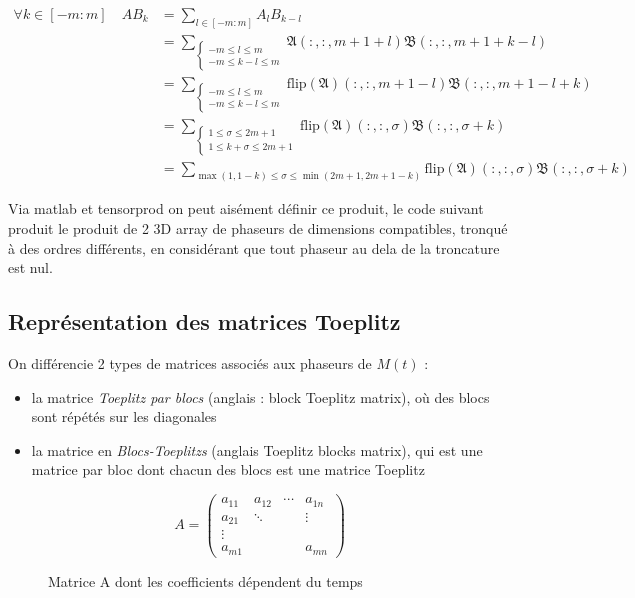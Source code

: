 \documentclass[journal,onecolumn]{IEEEtran}
\begin{document}
\begin{align}
\forall k \in [-m : m]\quad AB_{k} &= \sum_{l\in [-m: m]} A_{l} B_{k-l} \\
									&= \sum_{{\begin{cases}-m \leq l \leq m \\ -m \leq k-l \leq m\end{cases}}} \mathfrak{A}(:,:,m+1+l) \mathfrak{B}(:,:,m+1+k-l)\\
									&= \sum_{{\begin{cases}-m \leq l \leq m \\ -m \leq k-l \leq m\end{cases}}} \mathrm{flip}\left(\mathfrak{A}\right)(:,:,m+1-l) \mathfrak{B}(:,:,m+1-l+k)\\
									&= \sum_{{\begin{cases}1 \leq \sigma \leq 2m+1 \\ 1 \leq k+\sigma \leq 2m+1\end{cases}}} \mathrm{flip}\left(\mathfrak{A}\right)(:,:,\sigma) \mathfrak{B}(:,:,\sigma+k)\\
									&= \sum_{{\max (1,1-k) \leq \sigma \leq \min (2m+1,2m+1-k) }} \mathrm{flip}\left(\mathfrak{A}\right)(:,:,\sigma) \mathfrak{B}(:,:,\sigma+k)
\end{align}

Via matlab et tensorprod on peut aisément définir ce produit, le code suivant produit le produit de 2 3D array de phaseurs de dimensions compatibles, tronqué à des ordres différents, en considérant que tout phaseur au dela de la troncature est nul. 




\subsection{Représentation des matrices Toeplitz}

On différencie 2 types de matrices associés aux phaseurs de $M(t)$ : 
\begin{itemize}
\item la matrice \emph{Toeplitz par blocs} (anglais : block Toeplitz matrix), où des blocs sont répétés sur les diagonales
\item la matrice en \emph{Blocs-Toeplitzs} (anglais Toeplitz blocks matrix), qui est une matrice par bloc dont chacun des blocs est une matrice Toeplitz
\end{itemize}

\begin{figure}[h!]
\begin{equation}
    A = 
\begin{pmatrix}
a_{11} & a_{12} & \cdots & a_{1n}\\
a_{21} & \ddots & & \vdots\\
\vdots \\
a_{m1} & & & a_{mn}
\end{pmatrix} 
\end{equation}
\caption*{Matrice A dont les coefficients dépendent du temps }
\end{figure}
\end{document}
